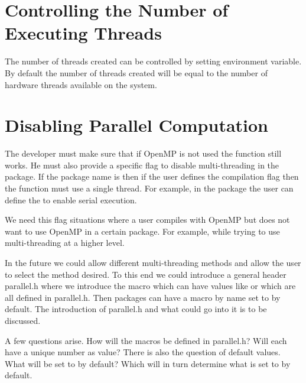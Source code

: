 \section{Controlling the Number of Executing Threads\label{sec:set_num_thread}}
The number of threads created can be controlled by setting
 environment variable. By default the number of
threads created will be equal to the number of hardware threads
available on the system.



\section{Disabling Parallel Computation\label{sec:disable_parallel}}
The developer must make sure that if OpenMP is not used the function
still works. He must also provide a specific flag to disable
multi-threading in the package. If the package name is  then
if the user defines the  compilation flag then
the function must use a single thread.
For example, in the  package the user
can define the  to enable
serial execution.

We need this flag situations where a user compiles with OpenMP but
does not want to use OpenMP in a certain package. For example, while
trying to use multi-threading at a higher level.

In the future we could allow different multi-threading methods and
allow the user to select the method desired. To this end we could
introduce a general header parallel.h where we introduce the macro
 which can have values like
 or 
which are all defined in parallel.h. Then packages can have a macro by
name  set to
 by default.
The introduction of parallel.h and what could go into it is to be
discussed.

A few questions arise. How will the  macros be
defined in parallel.h? Will each have a unique number as value? There
is also the question of default values. What will
 be set to by default? Which will in turn
determine what  is set to by
default.


